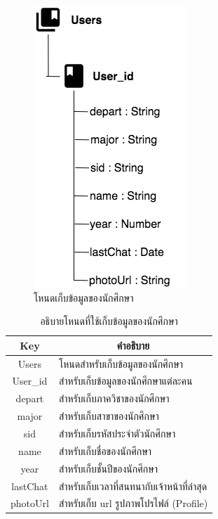 \newpage
\begin{figure}[H]
	\centering
	\includegraphics[width=0.35\columnwidth]
	{Figures/3/DB/nodeUser}
	\caption{โหนดเก็บข้อมูลของนักศึกษา}
	\label{Fig:DB4}
\end{figure}
\begin{table}[H]
	\centering
	\caption{อธิบายโหนดที่ใช้เก็บข้อมูลของนักศึกษา}
	\label{my-label1}
	\begin{tabular}{|c|p{10cm}|}
		\hline
		\multicolumn{1}{|c|}{\textbf{Key}} & \multicolumn{1}{c|}{\textbf{คำอธิบาย}} \\ \hline
		Users & โหนดสำหรับเก็บข้อมูลของนักศึกษา \\ \hline
		User\_id & สำหรับเก็บข้อมูลของนักศึกษาแต่ละคน \\ \hline
		depart & สำหรับเก็บภาควิชาของนักศึกษา\\ \hline
		major & สำหรับเก็บสาขาของนักศึกษา\\ \hline
		sid & สำหรับเก็บรหัสประจำตัวนักศึกษา \\ \hline
		name & สำหรับเก็บชื่อของนักศึกษา \\ \hline
		year & สำหรับเก็บชั้นปีของนักศึกษา \\ \hline
		lastChat & สำหรับเก็บเวลาที่สนทนากับเจ้าหน้าที่ล่าสุด \\ \hline
		photoUrl & สำหรับเก็บ url รูปภาพโปรไฟล์ (Profile) \\ \hline
	\end{tabular}
\end{table}

